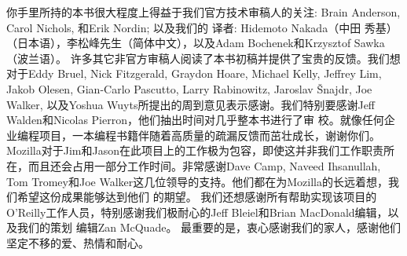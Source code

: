 
你手里所持的本书很大程度上得益于我们官方技术审稿人的关注: Brain Anderson, Carol Nichols, 和Erik Nordin; 以及我们的
译者: Hidemoto Nakada（中田 秀基）（日本语），李松峰先生（简体中文），以及Adam Bochenek和Krzysztof Sawka（波兰语）。
许多其它非官方审稿人阅读了本书初稿并提供了宝贵的反馈。我们想对于Eddy Bruel, Nick Fitzgerald, Graydon Hoare, Michael
 Kelly, Jeffrey Lim, Jakob Olesen, Gian-Carlo Pascutto, Larry Rabinowitz, Jaroslav Šnajdr, Joe Walker, 
以及Yoshua Wuyts所提出的周到意见表示感谢。我们特别要感谢Jeff Walden和Nicolas Pierron，他们抽出时间对几乎整本书进行了审
校。就像任何企业编程项目，一本编程书籍伴随着高质量的疏漏反馈而茁壮成长，谢谢你们。
Mozilla对于Jim和Jason在此项目上的工作极为包容，即使这并非我们工作职责所在，而且还会占用一部分工作时间。非常感谢Dave Camp, 
Naveed Ihsanullah, Tom Tromey和Joe Walker这几位领导的支持。他们都在为Mozilla的长远着想，我们希望这份成果能够达到他们
的期望。
我们还想感谢所有帮助实现该项目的O'Reilly工作人员，特别感谢我们极耐心的Jeff Bleiel和Brian MacDonald编辑，以及我们的策划
编辑Zan McQuade。
最重要的是，衷心感谢我们的家人，感谢他们坚定不移的爱、热情和耐心。